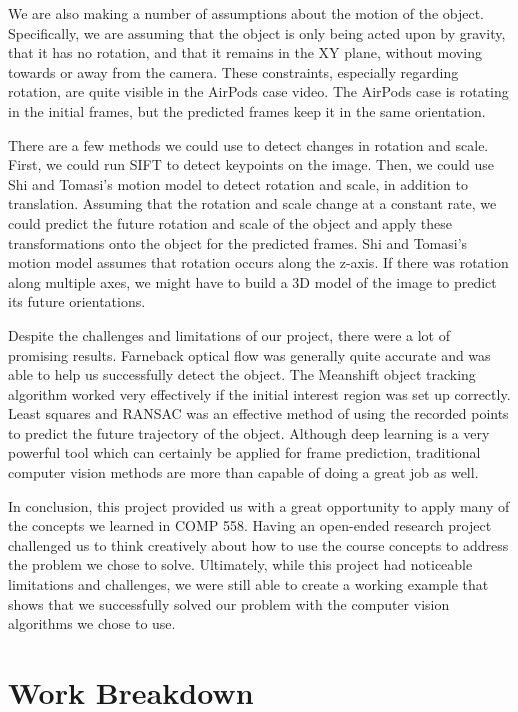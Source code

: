 \documentclass[12pt]{article}
\begin{document}
We are also making a number of assumptions about the motion of the object. Specifically, we are assuming that the object is only being acted upon by gravity, that it has no rotation, and that it remains in the XY plane, without moving towards or away from the camera. These constraints, especially regarding rotation, are quite visible in the AirPods case video. The AirPods case is rotating in the initial frames, but the predicted frames keep it in the same orientation. 

There are a few methods we could use to detect changes in rotation and scale. First, we could run SIFT to detect keypoints on the image. Then, we could use Shi and Tomasi's motion model \cite{shi_and_tomasi} to detect rotation and scale, in addition to translation. Assuming that the rotation and scale change at a constant rate, we could predict the future rotation and scale of the object and apply these transformations onto the object for the predicted frames. Shi and Tomasi's motion model assumes that rotation occurs along the z-axis. If there was rotation along multiple axes, we might have to build a 3D model of the image to predict its future orientations.

Despite the challenges and limitations of our project, there were a lot of promising results. Farneback optical flow was generally quite accurate and was able to help us successfully detect the object. The Meanshift object tracking algorithm worked very effectively if the initial interest region was set up correctly. Least squares and RANSAC was an effective method of using the recorded points to predict the future trajectory of the object. Although deep learning is a very powerful tool which can certainly be applied for frame prediction, traditional computer vision methods are more than capable of doing a great job as well. 

In conclusion, this project provided us with a great opportunity to apply many of the concepts we learned in COMP 558. Having an open-ended research project challenged us to think creatively about how to use the course concepts to address the problem we chose to solve. Ultimately, while this project had noticeable limitations and challenges, we were still able to create a working example that shows that we successfully solved our problem with the computer vision algorithms we chose to use.


\section*{Work Breakdown}
\end{document}
